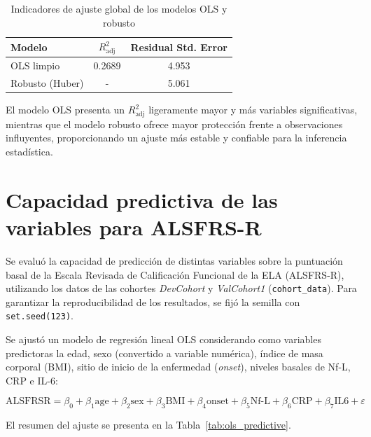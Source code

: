\documentclass[12pt]{article} %
\begin{document}
\begin{table}[h!]
\centering
\caption{Indicadores de ajuste global de los modelos OLS y robusto}
\label{tab:model_fit}
\begin{tabular}{lcc}
\hline
Modelo & $R^2_\text{adj}$ & Residual Std. Error \\
\hline
OLS limpio & 0.2689 & 4.953 \\
Robusto (Huber) & - & 5.061 \\
\hline
\end{tabular}
\end{table}

El modelo OLS presenta un $R^2_\text{adj}$ ligeramente mayor y más variables significativas, mientras que el modelo robusto ofrece mayor protección frente a observaciones influyentes, proporcionando un ajuste más estable y confiable para la inferencia estadística.

\section{Capacidad predictiva de las variables para ALSFRS-R}

Se evaluó la capacidad de predicción de distintas variables sobre la puntuación basal de la Escala Revisada de Calificación Funcional de la ELA (ALSFRS-R), utilizando los datos de las cohortes \textit{DevCohort} y \textit{ValCohort1} (\texttt{cohort\_data}). Para garantizar la reproducibilidad de los resultados, se fijó la semilla con \texttt{set.seed(123)}.

Se ajustó un modelo de regresión lineal OLS considerando como variables predictoras la edad, sexo (convertido a variable numérica), índice de masa corporal (BMI), sitio de inicio de la enfermedad (\textit{onset}), niveles basales de Nf-L, CRP e IL-6:

\[
\text{ALSFRSR} = \beta_0 + \beta_1 \text{age} + \beta_2 \text{sex} + \beta_3 \text{BMI} + \beta_4 \text{onset} + \beta_5 \text{Nf-L} + \beta_6 \text{CRP} + \beta_7 \text{IL6} + \varepsilon
\]

El resumen del ajuste se presenta en la Tabla~\ref{tab:ols_predictive}.
\end{document}
